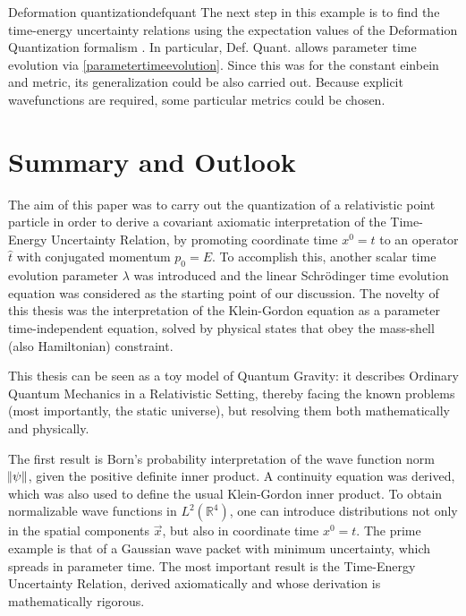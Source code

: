 \documentclass[twoside,a4paper,11pt]{article}
\numberwithin{equation}{section}
\begin{document}
\begin{futwork}{Deformation quantization}{defquant}
The next step in this example is to find the time-energy uncertainty relations using the expectation values of the Deformation Quantization formalism \cite{DefQuantPhys}. In particular, Def. Quant. allows parameter time evolution via \ref{parametertimeevolution}. Since this was for the constant einbein and metric, its generalization could be also carried out. Because explicit wavefunctions are required, some particular metrics could be chosen. 
\end{futwork}

\fi

\fi



\newpage


\section{Summary and Outlook}
\label{sec:discussion}
The aim of this paper was to carry out the quantization of a relativistic point particle in order to derive a covariant axiomatic interpretation of the Time-Energy Uncertainty Relation, by promoting coordinate time $x^0 =t$ to an operator $\hat{t}$ with conjugated momentum $p_0 = E$. To accomplish this, another scalar time evolution parameter $\lambda$ was introduced and the linear Schr{\"o}dinger time evolution equation was considered as the starting point of our discussion. The novelty of this thesis was the interpretation of the Klein-Gordon equation as a parameter time-independent equation, solved by physical states that obey the  mass-shell (also Hamiltonian) constraint.

This thesis can be seen as a toy model of Quantum Gravity: it describes Ordinary Quantum Mechanics in a Relativistic Setting, thereby facing the known problems (most importantly, the static universe), but resolving them both mathematically and physically.

The first result is Born's probability interpretation of the wave function norm $\norm{\psi}$, given the positive definite inner product. A continuity equation was derived, which was also used to define the usual Klein-Gordon inner product. To obtain normalizable wave functions in $L^2(\mathbb{R}^4)$, one can introduce distributions not only in the spatial components $\vec{x}$, but also in coordinate time $x^0 = t$. The prime example is that of a Gaussian wave packet with minimum uncertainty, which spreads in parameter time. The most important result is the Time-Energy Uncertainty Relation, derived axiomatically and whose derivation is mathematically rigorous. 
\end{document}
